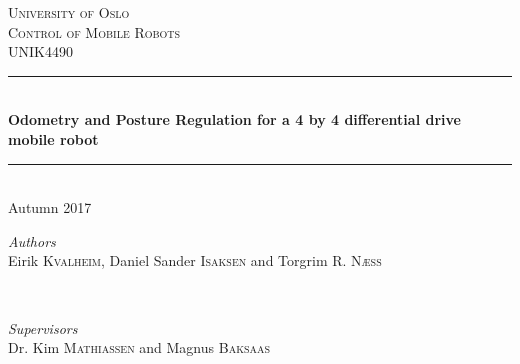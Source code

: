 \documentclass[a4paper,10pt]{article}
\begin{document}

\begin{titlepage} %
	\newcommand{\HRule}{\rule{\linewidth}{0.5mm}} %
	
	\center %
	

	
	\textsc{\LARGE University of Oslo}\\[1.5cm] %
	
	\textsc{\Large Control of Mobile Robots}\\[0.5cm] %
	
	\textsc{\large UNIK4490}\\[0.5cm] %
	
	
	\HRule\\[0.4cm]
	
	{\huge\bfseries Odometry and Posture Regulation for a 4 by 4 differential drive mobile robot}\\[0.4cm] %
	\HRule\\[0.8cm]
	{\large{Autumn 2017}} %
	\vspace{1cm}
	
	\begin{minipage}{0.4\textwidth}
		\begin{flushleft}
			\large
			\textit{Authors}\\
			Eirik \textsc{Kvalheim}, Daniel Sander \textsc{Isaksen} and Torgrim \textsc{R. Næss}
		\end{flushleft}
	\end{minipage}
	~
	\begin{minipage}{0.4\textwidth}
		\begin{flushright}
			\large
			\textit{Supervisors}\\
			Dr. Kim \textsc{Mathiassen} and Magnus \textsc{Baksaas}
		\end{flushright}
	\end{minipage}
	

\end{titlepage}
\end{document}
